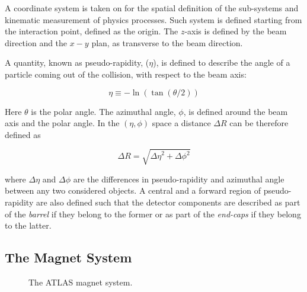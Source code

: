 			A coordinate system is taken on for the spatial definition of the sub-systems %
			and kinematic measurement of physics processes. Such system is defined starting from the interaction point, defined as the origin. The $z$-axis is defined by the beam direction and the $x-y$ plan, as transverse to the beam direction.

			A quantity, known as pseudo-rapidity, ($\eta$), is defined to describe the angle of a particle coming out of the collision, with respect to the beam axis: 

			\begin{equation*}
				\eta \equiv -\ln (\tan(\theta/2))
			\end{equation*}

			\noindent Here $\theta$ is the polar angle. The azimuthal angle, $\phi$, is defined around the beam axis and the polar angle. In the $(\eta,\phi)$ space a distance $\Delta R$ can be therefore defined as  
			
			\begin{equation*}
				\Delta R = \sqrt{{\Delta \eta}^2 + {\Delta \phi}^2}
			\end{equation*}

			\noindent where $\Delta \eta$ and $\Delta \phi$ are the differences in pseudo-rapidity and azimuthal angle between any two considered objects. A central and a forward region of pseudo-rapidity are also defined such that the detector components are described as part of the \emph{barrel} if they belong to the former or as part of the \emph{end-caps} if they belong to the latter. 



		\subsection{The Magnet System}
		\label{sec:magnet-system}
			
			\begin{figure}[!htb]
					\hfill
				\caption{The \ac{ATLAS} magnet system.}
			\end{figure}

